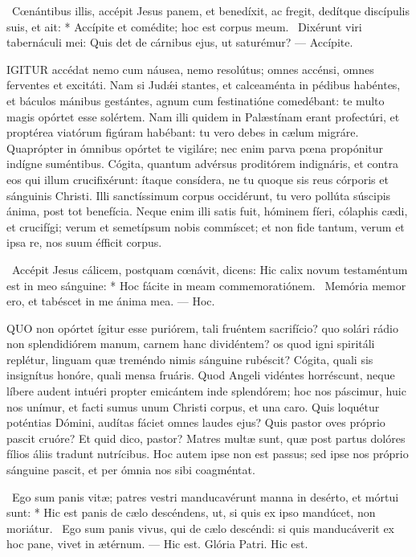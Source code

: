 \R\ Cœnántibus illis, accépit Jesus panem, et benedíxit, ac fregit, dedítque discípulis suis, et ait: * Accípite et comédite; hoc est corpus meum. \V\ Dixérunt viri tabernáculi mei: Quis det de cárnibus ejus, ut saturémur? --- Accípite.


\lettrine[lines=2]{I}{GITUR} accédat nemo cum náusea, nemo resolútus; omnes accénsi, omnes ferventes et excitáti. Nam si Judǽi stantes, et calceaménta in pédibus habéntes, et báculos mánibus gestántes, agnum cum festinatióne comedébant: te multo magis opórtet esse solértem. Nam illi quidem in Palæstínam erant profectúri, et proptérea viatórum figúram habébant: tu vero debes in cælum migráre. Quaprópter in ómnibus opórtet te vigiláre; nec enim parva pœna propónitur indígne suméntibus. Cógita, quantum advérsus proditórem indignáris, et contra eos qui illum crucifixérunt: ítaque consídera, ne tu quoque sis reus córporis et sánguinis Christi. Illi sanctíssimum corpus occidérunt, tu vero pollúta súscipis ánima, post tot benefícia. Neque enim illi satis fuit, hóminem fíeri, cólaphis cædi, et crucifígi; verum et semetípsum nobis commíscet; et non fide tantum, verum et ipsa re, nos suum éfficit corpus.

\R\ Accépit Jesus cálicem, postquam cœnávit, dicens: Hic calix novum testaméntum est in meo sánguine: * Hoc fácite in meam commemoratiónem. \V\ Memória memor ero, et tabéscet in me ánima mea. --- Hoc.


\lettrine[lines=2]{Q}{UO} non opórtet ígitur esse puriórem, tali fruéntem sacrifício? quo solári rádio non splendidiórem manum, carnem hanc dividéntem? os quod igni spiritáli replétur, linguam quæ treméndo nimis sánguine rubéscit? Cógita, quali sis insignítus honóre, quali mensa fruáris. Quod Angeli vidéntes horréscunt, neque líbere audent intuéri propter emicántem inde splendórem; hoc nos páscimur, huic nos unímur, et facti sumus unum Christi corpus, et una caro. Quis loquétur poténtias Dómini, audítas fáciet omnes laudes ejus? Quis pastor oves próprio pascit cruóre? Et quid dico, pastor? Matres multæ sunt, quæ post partus dolóres fílios áliis tradunt nutrícibus. Hoc autem ipse non est passus; sed ipse nos próprio sánguine pascit, et per ómnia nos sibi coagméntat.

\R\ Ego sum panis vitæ; patres vestri manducavérunt manna in desérto, et mórtui sunt: * Hic est panis de cælo descéndens, ut, si quis ex ipso mandúcet, non moriátur. \V\ Ego sum panis vivus, qui de cælo descéndi: si quis manducáverit ex hoc pane, vivet in ætérnum. --- Hic est. Glória Patri. Hic est.

